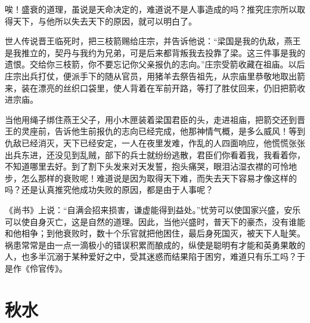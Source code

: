 \documentclass[12pt,UTF-8,openany,a4]{ctexbook}
\begin{document}
\begin{large}
    \yiwen 
    唉！盛衰的道理，虽说是天命决定的，难道说不是人事造成的吗？推究庄宗所以取得天下，与他所以失去天下的原因，就可以明白了。
    
    世人传说晋王临死时，把三枝箭赐给庄宗，并告诉他说：“梁国是我的仇敌，燕王是我推立的，契丹与我约为兄弟，可是后来都背叛我去投靠了梁。这三件事是我的遗恨。交给你三枝箭，你不要忘记你父亲报仇的志向。”庄宗受箭收藏在祖庙。以后庄宗出兵打仗，便派手下的随从官员，用猪羊去祭告祖先，从宗庙里恭敬地取出箭来，装在漂亮的丝织口袋里，使人背着在军前开路，等打了胜仗回来，仍旧把箭收进宗庙。
    
    当他用绳子绑住燕王父子，用小木匣装着梁国君臣的头，走进祖庙，把箭交还到晋王的灵座前，告诉他生前报仇的志向已经完成，他那神情气概，是多么威风！等到仇敌已经消灭，天下已经安定，一人在夜里发难，作乱的人四面响应，他慌慌张张出兵东进，还没见到乱贼，部下的兵士就纷纷逃散，君臣们你看着我，我看着你，不知道哪里去好。到了割下头发来对天发誓，抱头痛哭，眼泪沾湿衣襟的可怜地步，怎么那样的衰败呢！难道说是因为取得天下难，而失去天下容易才像这样的吗？还是认真推究他成功失败的原因，都是由于人事呢？
    
    《尚书》上说：“自满会招来损害，谦虚能得到益处。”忧劳可以使国家兴盛，安乐可以使自身灭亡，这是自然的道理。因此，当他兴盛时，普天下的豪杰，没有谁能和他相争；到他衰败时，数十个乐官就把他困住，最后身死国灭，被天下人耻笑。祸患常常是由一点一滴极小的错误积累而酿成的，纵使是聪明有才能和英勇果敢的人，也多半沉溺于某种爱好之中，受其迷惑而结果陷于困穷，难道只有乐工吗？于是作《伶官传》。
    
\end{large}



\chapter{秋水}
\end{document}
